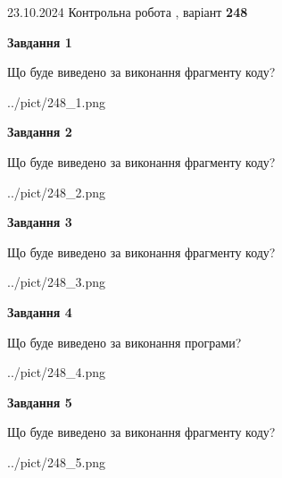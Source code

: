 \documentclass[12pt, ukrainian]{article}
\begin{document}
{\Large{23.10.2024 Контрольна робота , варіант  \No \textbf { 248 }\par}}
{
\begin {large}
{\begin {center}\textbf{Завдання 1}\end {center}}

Що буде виведено за виконання фрагменту коду?\par
\begin{center}
	{../pict/248_1.png}
\end{center}
\newpage

{\begin {center}\textbf{Завдання 2}\end {center}}

Що буде виведено за виконання фрагменту коду?\par
\begin{center}
	{../pict/248_2.png}
\end{center}
\newpage

{\begin {center}\textbf{Завдання 3}\end {center}}

Що буде виведено за виконання фрагменту коду?\par
\begin{center}
	{../pict/248_3.png}
\end{center}
\newpage

{\begin {center}\textbf{Завдання 4}\end {center}}

Що буде виведено за виконання програми?\par
\begin{center}
	{../pict/248_4.png}
\end{center}
\newpage

{\begin {center}\textbf{Завдання 5}\end {center}}

Що буде виведено за виконання фрагменту коду?\par
\begin{center}
	{../pict/248_5.png}
\end{center}
\newpage


\end{large}}
\end{document}
